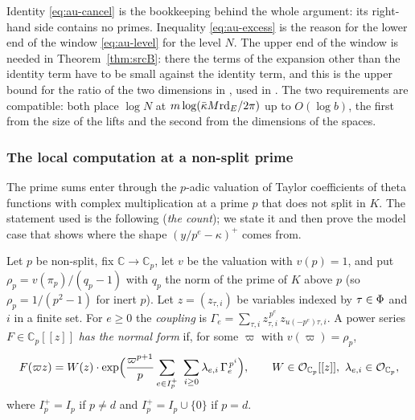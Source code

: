 \documentclass[10pt]{amsart}
\theoremstyle{definition}
\theoremstyle{remark}
\newcommand{\C}{\mathbb C}
\begin{document}
Identity \eqref{eq:au-cancel} is the bookkeeping behind the whole argument: its right-hand side
contains no primes. Inequality \eqref{eq:au-excess} is the reason for the lower end of the window \eqref{eq:au-level} for the level $N$. The upper end
of the window is needed in Theorem~\ref{thm:srcB}: there the terms of the expansion other than
the identity term have to be small against the identity term, and this is the upper bound for the
ratio of the two dimensions in {\cite[Lemma~2.22]{P51}}, used in {\cite[Proposition~3.31]{P51}}. The two
requirements are compatible: both place $\log N$ at $m\log(\bar\kappa M\mathrm{rd}_E/2\pi)$ up to
$O(\log b)$, the first from the size of the lifts and the second from the dimensions of the spaces.

\subsubsection*{The local computation at a non-split prime}
The prime sums enter through the $p$-adic valuation of Taylor coefficients of theta functions
with complex multiplication at a prime $p$ that does not split in $K$. The statement used is the
following (\emph{the count}); we state it and then prove the model case that
shows where the shape $(y/p^e-\kappa)^+$ comes from.

Let $p$ be non-split, fix $\C\to\C_p$, let $v$ be the valuation with $v(p)=1$, and put
$\rho_p=v(\pi_p)/(q_p-1)$ with $q_p$ the norm of the prime of $K$ above $p$ (so
$\rho_p=1/(p^2-1)$ for inert $p$). Let $z=(z_{\tau,i})$ be variables indexed by $\tau\in\Phi$ and
$i$ in a finite set. For $e\ge0$ the \emph{coupling} is $\Gamma_e=\sum_{\tau,i}z_{\tau,i}^{\,p^e}
\,z_{u(-p^e)\tau,i}$. A power series $F\in\C_p[[z]]$ \emph{has the normal form} if, for some
$\varpi$ with $v(\varpi)=\rho_p$,
\begin{equation}\label{eq:au-normal}
F(\varpi z)=W(z)\cdot\exp\Bigl(\frac{\varpi^{p+1}}p\sum_{e\in I_p^+}\ \sum_{i\ge0}
\lambda_{e,i}\,\Gamma_e^{\,p^i}\Bigr),\qquad W\in\auO_{\C_p}[[z]],\ \lambda_{e,i}\in\auO_{\C_p},
\end{equation}
where $I_p^+=I_p$ if $p\ne d$ and $I_p^+=I_p\cup\{0\}$ if $p=d$.
\end{document}
